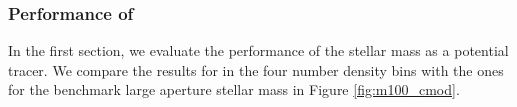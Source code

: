 \documentclass[a4paper,fleqn,usenatbib]{mnras}
\begin{document}
\subsubsection{Performance of \mcmodel{}}
    \label{sec:cmodel}


    In the first section, we evaluate the performance of the \cmodel{} stellar mass as a
    potential \mvir{} tracer.
    We compare the results for \mcmodel{} in the four number density bins with the ones for
    the benchmark large aperture stellar mass  in Figure \ref{fig:m100_cmod}.

\end{document}
